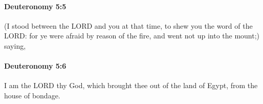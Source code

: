 		\paragraph{Deuteronomy 5:5} %
			\label{DEUTERONOMY-5-5}

			(I stood between the LORD and you at that time, to shew you the word of the LORD: for ye were afraid by reason of the fire, and went not up into the mount;) saying,


		\paragraph{Deuteronomy 5:6} %
			\label{DEUTERONOMY-5-6}

			I am the LORD thy God, which brought thee out of the land of Egypt, from the house of bondage.


